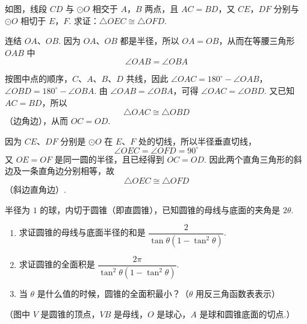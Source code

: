 \begin{problem}
如图，线段 \(CD\) 与 \(\odot O\) 相交于 \(A\)，\(B\) 两点，且 \(AC=BD\)，又 \(CE\)，\(DF\) 分别与 \(\odot O\) 相切于 \(E\)，\(F\). 求证：\(\triangle OEC\cong\triangle OFD\).

\end{problem}

\begin{solution}
连结 \(OA\)、\(OB\). 因为 \(OA\)、\(OB\) 都是半径，所以 \(OA=OB\)，从而在等腰三角形 \(OAB\) 中
\[
\angle OAB=\angle OBA
\]


按图中点的顺序，\(C\)、\(A\)、\(B\)、\(D\) 共线，因此
\(\angle OAC=180^\circ-\angle OAB\)，\(\angle OBD=180^\circ-\angle OBA\).
由 \(\angle OAB=\angle OBA\)，可得 \(\angle OAC=\angle OBD\). 又已知 \(AC=BD\)，所以
\[
\triangle OAC\cong\triangle OBD
\]
（边角边），从而 \(OC=OD\).

因为 \(CE\)、\(DF\) 分别是 \(\odot O\) 在 \(E\)、\(F\) 处的切线，所以半径垂直切线，
\[
\angle OEC=\angle OFD=90^\circ
\]
又 \(OE=OF\) 是同一圆的半径，且已经得到 \(OC=OD\). 因此两个直角三角形的斜边及一条直角边分别相等，故
\[
\triangle OEC\cong\triangle OFD
\]
（斜边直角边）.
\end{solution}

\begin{problem}
半径为 \(1\) 的球，内切于圆锥（即直圆锥），已知圆锥的母线与底面的夹角是 \(2\theta\).

\begin{enumerate}
\item 求证圆锥的母线与底面半径的和是 \(\dfrac{2}{\tan\theta\left(1-\tan^2\theta\right)}\).
\item 求证圆锥的全面积是 \(\dfrac{2\pi}{\tan^2\theta\left(1-\tan^2\theta\right)}\).
\item 当 \(\theta\) 是什么值的时候，圆锥的全面积最小？（\(\theta\) 用反三角函数表表示）
\end{enumerate}

（图中 \(V\) 是圆锥的顶点，\(VB\) 是母线，\(O\) 是球心，\(A\) 是球和圆锥底面的切点.）

\problemresetlayout
{}
\end{problem}

